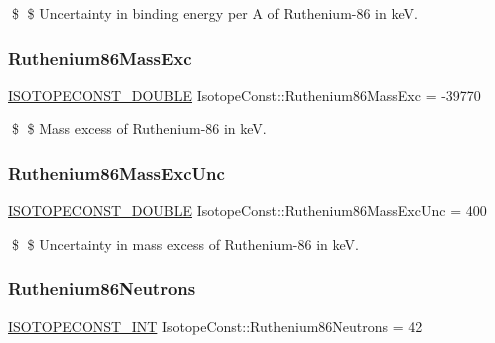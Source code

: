 \$ \$ Uncertainty in binding energy per A of Ruthenium-\/86 in keV. \mbox{\label{group___isotope_const-_ruthenium-_ru86_gaababaf31013bdfb5a7ea2ca73758dd1d}} 
\subsubsection{\texorpdfstring{Ruthenium86\+Mass\+Exc}{Ruthenium86MassExc}}
{\footnotesize\ttfamily \mbox{\hyperlink{group___isotope_const-_macros_ga8f45a7272ce02c0b4c65c44636ed719a}{I\+S\+O\+T\+O\+P\+E\+C\+O\+N\+S\+T\+\_\+\+D\+O\+U\+B\+LE}} Isotope\+Const\+::\+Ruthenium86\+Mass\+Exc = -\/39770}

\$ \$ Mass excess of Ruthenium-\/86 in keV. \mbox{\label{group___isotope_const-_ruthenium-_ru86_ga72ba2f08cc16528613f7ef837f5b6de8}} 
\subsubsection{\texorpdfstring{Ruthenium86\+Mass\+Exc\+Unc}{Ruthenium86MassExcUnc}}
{\footnotesize\ttfamily \mbox{\hyperlink{group___isotope_const-_macros_ga8f45a7272ce02c0b4c65c44636ed719a}{I\+S\+O\+T\+O\+P\+E\+C\+O\+N\+S\+T\+\_\+\+D\+O\+U\+B\+LE}} Isotope\+Const\+::\+Ruthenium86\+Mass\+Exc\+Unc = 400}

\$ \$ Uncertainty in mass excess of Ruthenium-\/86 in keV. \mbox{\label{group___isotope_const-_ruthenium-_ru86_gaff6db94f3e180768a8f184afcc82abf9}} 
\subsubsection{\texorpdfstring{Ruthenium86\+Neutrons}{Ruthenium86Neutrons}}
{\footnotesize\ttfamily \mbox{\hyperlink{group___isotope_const-_macros_ga5f18360b3e99483a35c32d789e62621c}{I\+S\+O\+T\+O\+P\+E\+C\+O\+N\+S\+T\+\_\+\+I\+NT}} Isotope\+Const\+::\+Ruthenium86\+Neutrons = 42}

